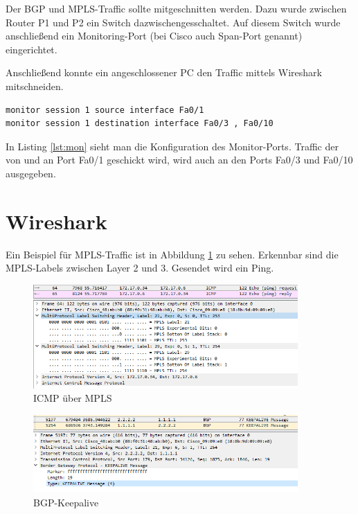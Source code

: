 Der \ac{BGP} und \ac{MPLS}-Traffic sollte mitgeschnitten werden.
Dazu wurde zwischen Router P1 und P2 ein Switch dazwischengesschaltet. Auf diesem Switch wurde anschließend ein Monitoring-Port (bei Cisco auch Span-Port genannt) eingerichtet.

Anschließend konnte ein angeschlossener PC den Traffic mittels Wireshark mitschneiden.

\begin{lstlisting}[caption={Monitoring-Ports},label={lst:mon},language={}]
monitor session 1 source interface Fa0/1
monitor session 1 destination interface Fa0/3 , Fa0/10
\end{lstlisting}

In Listing \ref{lst:mon} sieht man die Konfiguration des Monitor-Ports. Traffic der von und an Port Fa0/1 geschickt wird, wird auch an den Ports Fa0/3 und Fa0/10 ausgegeben.

\section{Wireshark}

Ein Beispiel für \ac{MPLS}-Traffic ist in Abbildung \ref{img:icmp} zu sehen. Erkennbar sind die MPLS-Labels zwischen Layer 2 und 3. Gesendet wird ein Ping.

\begin{figure}[H]
	\centering
	\includegraphics[width=0.9\textwidth]{img/icmp_wireshark.png}
	\caption{ICMP über MPLS}
	\label{img:icmp}
\end{figure}

\begin{figure}[H]
	\centering
	\includegraphics[width=0.9\textwidth]{img/bgp_wireshark.png}
	\caption{BGP-Keepalive}
	\label{img:bgp}
\end{figure}

